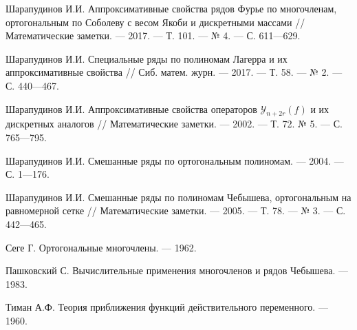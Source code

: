 \begin{thebibliography}{99}
Шарапудинов И.И. Аппроксимативные свойства рядов Фурье по многочленам, ортогональным по Соболеву с весом Якоби и дискретными массами // Математические заметки. --- 2017. --- Т. 101. --- № 4. --- С. 611---629.










Шарапудинов И.И. Специальные ряды по полиномам Лагерра и их аппроксимативные свойства // Сиб. матем. журн. --- 2017. --- Т. 58. --- № 2. --- С. 440---467.










Шарапудинов И.И. Аппроксимативные свойства операторов $\mathcal{Y}_{n+2r}(f)$ и их дискретных аналогов // Математические заметки. --- 2002. --- Т. 72. № 5. --- С. 765---795.










Шарапудинов И.И. Смешанные ряды по ортогональным полиномам. --- 2004. --- С. 1---176.










Шарапудинов И.И. Смешанные ряды по полиномам Чебышева, ортогональным на равномерной сетке // Математические заметки. --- 2005. --- Т. 78. --- № 3. --- С. 442---465.









Сеге Г. Ортогональные многочлены. --- 1962.










Пашковский С. Вычислительные применения многочленов и рядов Чебышева. --- 1983.










Тиман А.Ф. Теория приближения функций действительного переменного. --- 1960.











\end{thebibliography}

